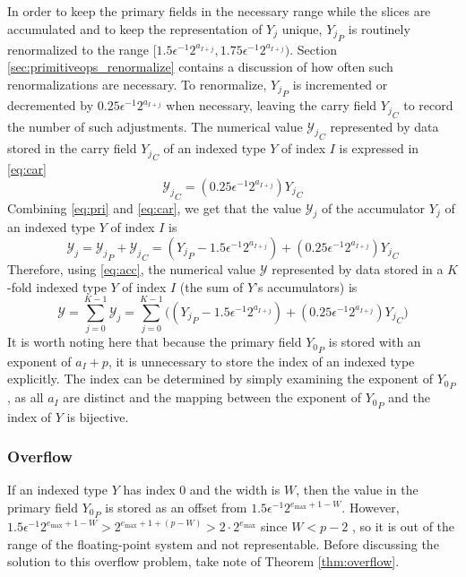\documentclass[12pt]{article}
\providecommand{\max}{\ensuremath{\text{max}}}
\theoremstyle{definition}
\numberwithin{equation}{section}
\numberwithin{figure}{section}
\begin{document}
      In order to keep the primary fields in the necessary range while the slices are accumulated and to keep the representation of $Y_j$ unique, ${Y_j}_P$ is routinely renormalized to the range $[1.5 \epsilon^{-1} 2^{a_{I + j}}, 1.75 \epsilon^{-1} 2^{a_{I + j}})$. Section \ref{sec:primitiveops_renormalize} contains a discussion of how often such renormalizations are necessary.
      To renormalize, ${Y_j}_P$ is incremented or decremented by $0.25 \epsilon^{-1} 2^{a_{I + j}}$ when necessary, leaving the carry field ${Y_j}_C$ to record the number of such adjustments.
      The numerical value ${\mathcal{Y}_j}_C$ represented by data stored in the carry field ${Y_j}_C$ of an indexed type $Y$ of index $I$ is expressed in \eqref{eq:car}
      \begin{equation}
        {\mathcal{Y}_j}_C = (0.25\epsilon^{-1}2^{a_{I + j}}){Y_j}_C
        \label{eq:car}
      \end{equation}
      Combining \eqref{eq:pri} and \eqref{eq:car}, we get that the value $\mathcal{Y}_j$ of the accumulator $Y_j$ of an indexed type $Y$ of index $I$ is
      \begin{equation}
        \mathcal{Y}_j = {\mathcal{Y}_j}_P + {\mathcal{Y}_j}_C = ({Y_j}_P - 1.5 \epsilon^{-1}2^{a_{I + j}}) + (0.25\epsilon^{-1}2^{a_{I + j}}){Y_j}_C
        \label{eq:acc}
      \end{equation}
      Therefore, using  \eqref{eq:acc}, the numerical value $\mathcal{Y}$ represented by data stored in a $K$-fold indexed type $Y$ of index $I$ (the sum of $Y$'s accumulators) is
      \begin{equation}
        \mathcal{Y} = \sum\limits_{j = 0}^{K - 1} \mathcal{Y}_j = \sum\limits_{j = 0}^{K - 1} \bigl(({Y_j}_P - 1.5 \epsilon^{-1}2^{a_{I + j}}) + (0.25\epsilon^{-1}2^{a_{I + j}}){Y_j}_C\bigr)
        \label{eq:indexedvalue}
      \end{equation}
      It is worth noting here that because the primary field ${Y_0}_P$ is stored with an exponent of $a_I + p$, it is unnecessary to store the index of an indexed type explicitly. The index can be determined by simply examining the exponent of ${Y_0}_P$, as all $a_I$ are distinct and the mapping between the exponent of ${Y_0}_P$ and the index of $Y$ is bijective.

    \subsubsection{Overflow}
      \label{sec:indexed_overflow}
      If an indexed type $Y$ has index 0 and the width is $W$, then the value in the primary field ${Y_0}_P$ is stored as an offset from $1.5\epsilon^{-1}2^{e_{\max} + 1 - W}$. However, $1.5\epsilon^{-1}2^{e_{\max} + 1 - W} > 2^{e_{\max} + 1 + (p - W)} > 2 \cdot 2^{e_{\max}}$ since $W < p - 2$ \cite{repsum}, so it is out of the range of the floating-point system and not representable. Before discussing the solution to this overflow problem, take note of Theorem \ref{thm:overflow}.
\end{document}
